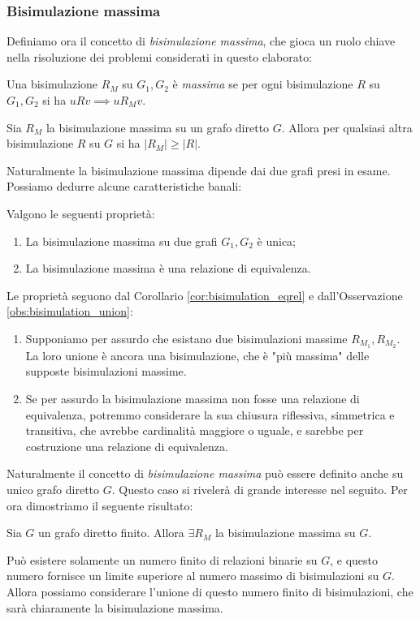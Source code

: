 \subsubsection{Bisimulazione massima}
\label{sec:bisi_max}
Definiamo ora il concetto di \emph{bisimulazione massima}, che gioca un ruolo chiave nella risoluzione dei problemi considerati in questo elaborato:
\begin{definition}
    Una bisimulazione $R_M$ su $G_1, G_2$ è \emph{massima} se per ogni bisimulazione $R$ su $G_1,G_2$ si ha $u R v \implies u R_M v$.
\end{definition}
\begin{observation}
    Sia $R_M$ la bisimulazione massima su un grafo diretto $G$. Allora per qualsiasi altra bisimulazione $R$ su $G$ si ha $|R_M| \geq |R|$.
\end{observation}
Naturalmente la bisimulazione massima dipende dai due grafi presi in esame. Possiamo dedurre alcune caratteristiche banali:
\begin{proposition}
    Valgono le seguenti proprietà:
    \begin{enumerate}
        \item La bisimulazione massima su due grafi $G_1,G_2$ è unica;
        \item La bisimulazione massima è una relazione di equivalenza.
    \end{enumerate}
    \vspace*{-0.3cm}
    \label{prop:bisi_max_equi}
\end{proposition}
\begin{proof2}
    Le proprietà seguono dal Corollario \ref{cor:bisimulation_eqrel} e dall'Osservazione \ref{obs:bisimulation_union}:
    \begin{enumerate}
        \item Supponiamo per assurdo che esistano due bisimulazioni massime $R_{M_1}, R_{M_2}$. La loro unione è ancora una bisimulazione, che è "più massima" delle supposte bisimulazioni massime.
        \item Se per assurdo la bisimulazione massima non fosse una relazione di equivalenza, potremmo considerare la sua chiusura riflessiva, simmetrica e transitiva, che avrebbe cardinalità maggiore o uguale, e sarebbe per costruzione una relazione di equivalenza.
    \end{enumerate}
    \vspace*{-0.7cm}
\end{proof2}
Naturalmente il concetto di \emph{bisimulazione massima} può essere definito anche su unico grafo diretto $G$. Questo caso si rivelerà di grande interesse nel seguito. Per ora dimostriamo il seguente risultato:
\begin{theorem}
    Sia $G$ un grafo diretto finito. Allora $\exists R_M$ la bisimulazione massima su $G$.
\end{theorem}
\begin{proof2}
    Può esistere solamente un numero finito di relazioni binarie su $G$, e questo numero fornisce un limite superiore al numero massimo di bisimulazioni su $G$.
    Allora possiamo considerare l'unione di questo numero finito di bisimulazioni, che sarà chiaramente la bisimulazione massima.
\end{proof2}

